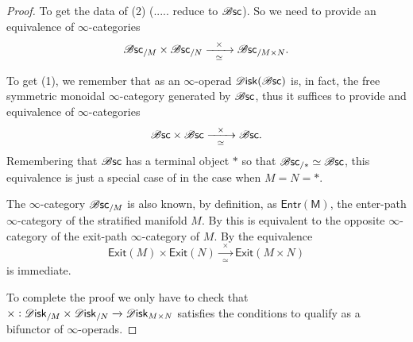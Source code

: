 \documentclass[../text.tex]{subfiles}
\begin{document}
\begin{proof}
    To get the data of (2) (..... reduce to $\mathscr{B} \mathsf{sc}$). So we need to provide an equivalence of $\infty$-categories
    \begin{equation}\label{eq:b/M_x_b/N=b/MxN}
        \mathscr{B} \mathsf{sc}_{/M} \times \mathscr{B} \mathsf{sc}_{/N} \xrightarrow[\ \ \simeq \ \ ]{\times} \mathscr{B} \mathsf{sc}_{/M \times N}.
    \end{equation}

    To get (1), we remember that as an $\infty$-operad $\disk(\bsc)$ is, in fact, the free symmetric monoidal $\infty$-category generated by $\mathscr{B} \mathsf{sc}$, thus it suffices to provide and equivalence of $\infty$-categories
    \begin{equation}
        \bsc \times \bsc \xrightarrow[\ \ \simeq \ \ ]{\times} \bsc.
    \end{equation}
    Remembering that $\mathscr{B} \mathsf{sc}$ has a terminal object $*$ so that $\mathscr{B} \mathsf{sc}_{/*} \simeq \mathscr{B} \mathsf{sc}$, this equivalence is just a special case of  in the case when $M = N = *$.

    The $\infty$-category $\mathscr{B} \mathsf{sc}_{/M}$ is also known, by definition, as $\mathsf{Entr(M)}$, the enter-path $\infty$-category of the stratified manifold $M$. By \cite[Lem.3.3.9]{afr_homhyp} this is equivalent to the opposite $\infty$-category of the exit-path $\infty$-category of $M$. By \cite[Obs.3.3.3]{afr_homhyp} the equivalence
    \begin{equation}
        \mathsf{Exit}(M) \times \mathsf{Exit}(N) \xrightarrow[\ \ \simeq \ \ ]{\times} \mathsf{Exit}(M \times N)
    \end{equation}
    is immediate.

    To complete the proof we only have to check that $\times: \disk_{/M} \times \disk_{/N} \xrightarrow{} \disk_{M \times N}$ satisfies the conditions to qualify as a bifunctor of $\infty$-operads.
\end{proof}
\end{document}
